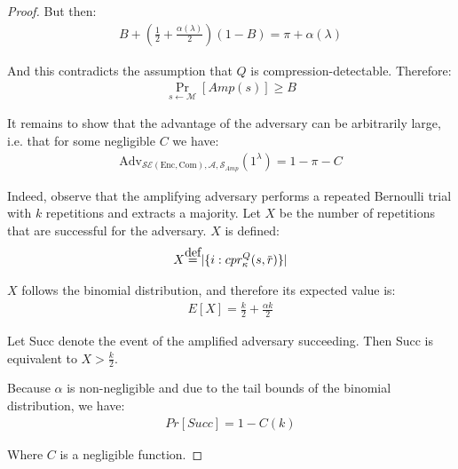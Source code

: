 \begin{proof}
But then:
\begin{align*}
    B + (\frac{1}{2} + \frac{\alpha(\lambda)}{2})(1 - B) =
    \pi + \alpha(\lambda)
\end{align*}

And this contradicts the assumption that $Q$ is compression-detectable. Therefore:
\begin{align*}
    \Pr_{s \leftarrow \mathcal{M}}
    [Amp(s)] \geq B
\end{align*}

It remains to show that the advantage of the adversary can be
arbitrarily large, i.e. that for some negligible $C$ we have:
\begin{align*}
    \text{Adv}_{\mathcal{SE}(\textrm{Enc}, \textrm{Com}), \mathcal{A}, \mathcal{S}_{Amp}}
    (1^\lambda) = 1 - \pi - C
\end{align*}

Indeed, observe that the amplifying adversary performs a repeated Bernoulli
trial with $k$ repetitions and extracts a majority. Let $X$ be the number of
repetitions that are successful for the adversary. $X$ is defined:
\begin{align*}
    X \defeq |\{ i: cpr^Q_{\kappa}(s, \overbar{r}) \}|
\end{align*}

$X$ follows the binomial distribution, and therefore its expected value is:
\begin{align*}
    E[X] = \frac{k}{2} + \frac{\alpha k}{2}
\end{align*}

Let Succ denote the event of the amplified adversary succeeding. Then Succ
is equivalent to $X > \frac{k}{2}$.

Because $\alpha$ is non-negligible and due to the tail bounds of the binomial
distribution, we have:
\begin{align*}
    Pr[Succ] = 1 - C(k)
\end{align*}

Where $C$ is a negligible function.
\end{proof}
